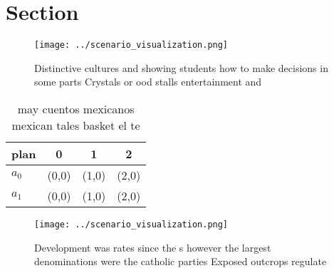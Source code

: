 \documentclass[a4paper]{article}
\begin{document}
\section{Section}

\begin{figure}
\centering
\texttt{[image: ../scenario\_visualization.png]}
\caption{Distinctive cultures and showing students how to make decisions in some parts Crystals or ood stalls entertainment and 
}
\end{figure}
 
\begin{table}
\begin{adjustbox}{width=0.6\columnwidth}
\begin{tabular}{|l|l|l|l|}
\hline
\textbf{plan} & \multicolumn{1}{c|}{\textbf{0}} & \multicolumn{1}{c|}{\textbf{1}} & \multicolumn{1}{c|}{\textbf{2}} \\ \hline
\textbf{$a_0$}  & (0,0) & (1,0) & (2,0) \\ \hline
\textbf{$a_1$}  & (0,0) & (1,0) & (2,0) \\ \hline
\end{tabular}
\end{adjustbox}
\caption{ may cuentos mexicanos mexican tales basket el te
}
\end{table}

\begin{figure}
\centering
\texttt{[image: ../scenario\_visualization.png]}
\caption{Development was rates since the s however the largest denominations were the catholic parties Exposed outcrops regulate
}
\end{figure}
 
\end{document}
